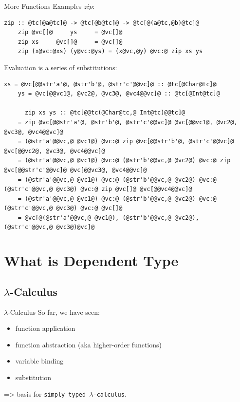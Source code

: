 \documentclass[xcolor={usenames,dvipsnames}]{beamer}
\begin{document}
\begin{frame}[fragile]{More Functions Examples}
  $zip$:
  \begin{lstlisting}[style=hask]
    zip :: @tc[@a@tc]@ -> @tc[@b@tc]@ -> @tc[@(a@tc,@b)@tc]@
    zip @vc[]@     ys     = @vc[]@
    zip xs     @vc[]@     = @vc[]@
    zip (x@vc:@xs) (y@vc:@ys) = (x@vc,@y) @vc:@ zip xs ys
  \end{lstlisting}

  Evaluation is a series of substitutions:
  \begin{lstlisting}[style=hask]
    xs = @vc[@@str'a'@, @str'b'@, @str'c'@@vc]@ :: @tc[@Char@tc]@
    ys = @vc[@@vc1@, @vc2@, @vc3@, @vc4@@vc]@ :: @tc[@Int@tc]@

      zip xs ys :: @tc[@@tc(@Char@tc,@ Int@tc)@@tc]@
    = zip @vc[@@str'a'@, @str'b'@, @str'c'@@vc]@ @vc[@@vc1@, @vc2@, @vc3@, @vc4@@vc]@
    = (@str'a'@@vc,@ @vc1@) @vc:@ zip @vc[@@str'b'@, @str'c'@@vc]@ @vc[@@vc2@, @vc3@, @vc4@@vc]@
    = (@str'a'@@vc,@ @vc1@) @vc:@ (@str'b'@@vc,@ @vc2@) @vc:@ zip @vc[@@str'c'@@vc]@ @vc[@@vc3@, @vc4@@vc]@
    = (@str'a'@@vc,@ @vc1@) @vc:@ (@str'b'@@vc,@ @vc2@) @vc:@ (@str'c'@@vc,@ @vc3@) @vc:@ zip @vc[]@ @vc[@@vc4@@vc]@
    = (@str'a'@@vc,@ @vc1@) @vc:@ (@str'b'@@vc,@ @vc2@) @vc:@ (@str'c'@@vc,@ @vc3@) @vc:@ @vc[]@
    = @vc[@(@str'a'@@vc,@ @vc1@), (@str'b'@@vc,@ @vc2@), (@str'c'@@vc,@ @vc3@)@vc]@
  \end{lstlisting}
\end{frame}


\section{What is Dependent Type}

\subsection{$\lambda$-Calculus}

\begin{frame}[fragile]{$\lambda$-Calculus}
  So far, we have seen:
  \begin{itemize}
    \item function application
    \item function abstraction {\tiny(aka higher-order functions)}
    \item variable binding
    \item substitution
  \end{itemize}
  => basis for \texttt{simply typed $\lambda$-calculus}.
\end{frame}
\end{document}
